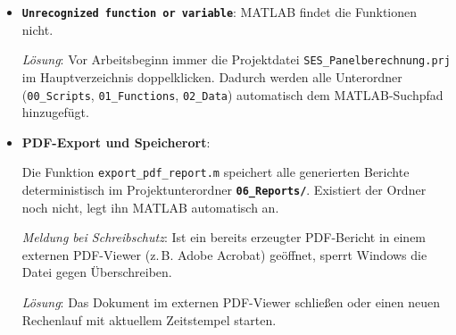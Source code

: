 \begin{itemize}
    \item \textbf{\texttt{Unrecognized function or variable}}:
    MATLAB findet die Funktionen nicht. \par
    \textit{Lösung}: Vor Arbeitsbeginn immer die Projektdatei \texttt{SES\_Panelberechnung.prj} im Hauptverzeichnis doppelklicken. Dadurch werden alle Unterordner (\texttt{00\_Scripts}, \texttt{01\_Functions}, \texttt{02\_Data}) automatisch dem MATLAB-Suchpfad hinzugefügt.

    \item \textbf{PDF-Export und Speicherort}: \par
    Die Funktion \texttt{export\_pdf\_report.m} speichert alle generierten Berichte deterministisch im Projektunterordner \textbf{\texttt{06\_Reports/}}. Existiert der Ordner noch nicht, legt ihn MATLAB automatisch an. \par
    \textit{Meldung bei Schreibschutz}: Ist ein bereits erzeugter PDF-Bericht in einem externen PDF-Viewer (z.\,B. Adobe Acrobat) geöffnet, sperrt Windows die Datei gegen Überschreiben. \par
    \textit{Lösung}: Das Dokument im externen PDF-Viewer schließen oder einen neuen Rechenlauf mit aktuellem Zeitstempel starten.
\end{itemize}
